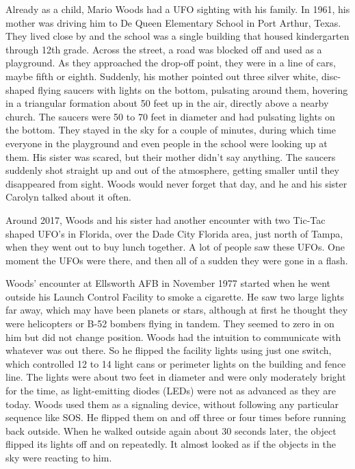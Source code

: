 Already as a child, Mario Woods had a UFO sighting with his family.
In 1961, his mother was driving him to De Queen Elementary School in Port Arthur, Texas.
They lived close by and the school was a single building that housed kindergarten through 12th grade.
Across the street, a road was blocked off and used as a playground. As they approached the drop-off point,
they were in a line of cars, maybe fifth or eighth. Suddenly, his mother pointed out three silver white, disc-shaped flying saucers
with lights on the bottom, pulsating around them,
hovering in a triangular formation about 50 feet up in the air, directly above a nearby church. The saucers were 50 to 70 feet in diameter and had pulsating lights on the bottom. They stayed in the sky for a couple of minutes, during which time everyone in the playground and even people in the school were looking up at them. His sister was scared, but their mother didn't say anything. The saucers suddenly shot straight up and out of the atmosphere, getting smaller until they disappeared from sight.
Woods would never forget that day, and he and his sister Carolyn talked about it often.

Around 2017, Woods and his sister had another encounter with  two Tic-Tac shaped UFO's in Florida,
over the Dade City Florida area, just north of Tampa,  when they went out to buy lunch together. A lot of people saw these UFOs.
One moment the UFOs were there, and then all of a sudden they were gone in a flash.

Woods' encounter at Ellsworth AFB in November 1977 started when he went outside his Launch Control Facility to smoke a cigarette.
He saw two large lights far away, which may have been planets or stars, although at first he thought they were helicopters or B-52 bombers
flying in tandem. They seemed to zero in on him but did not change position.
Woods had the intuition to communicate with whatever was out there.
So he flipped the facility lights using just one switch, which controlled 12 to 14 light cans or perimeter lights on the building and fence line.
The lights were about two feet in diameter and were only moderately bright for the time, as light-emitting diodes (LEDs) were not as advanced as they are today.
Woods used them as a signaling device, without following any particular sequence like SOS.
He flipped them on and off three or four times before running back outside.
When he walked outside again about 30 seconds later, the object flipped its lights off and on repeatedly.
It almost looked as if the objects in the sky were reacting to him.

